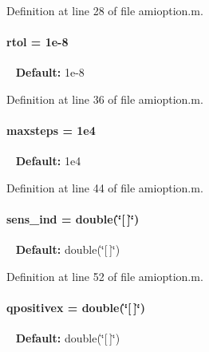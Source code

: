 Definition at line 28 of file amioption.\+m.

\hypertarget{classamioption_a7978e9a4674f869e6b2950e2f6262ca5}{}
\paragraph[{rtol}]{\setlength{\rightskip}{0pt plus 5cm}rtol = 1e-\/8}\label{classamioption_a7978e9a4674f869e6b2950e2f6262ca5}
~\newline
{\bfseries Default\+:} 1e-\/8 

Definition at line 36 of file amioption.\+m.

\hypertarget{classamioption_ac37622882dacee1f11688d4941ccb45e}{}
\paragraph[{maxsteps}]{\setlength{\rightskip}{0pt plus 5cm}maxsteps = 1e4}\label{classamioption_ac37622882dacee1f11688d4941ccb45e}
~\newline
{\bfseries Default\+:} 1e4 

Definition at line 44 of file amioption.\+m.

\hypertarget{classamioption_a0505783cf66f362672cbe3320d47a94d}{}
\paragraph[{sens\+\_\+ind}]{\setlength{\rightskip}{0pt plus 5cm}sens\+\_\+ind = double(\char`\"{}\mbox{[}$\,$\mbox{]}\char`\"{})}\label{classamioption_a0505783cf66f362672cbe3320d47a94d}
~\newline
{\bfseries Default\+:} double(\char`\"{}\mbox{[}$\,$\mbox{]}\char`\"{}) 

Definition at line 52 of file amioption.\+m.

\hypertarget{classamioption_a8938c19fd7067f4780be8255764210b7}{}
\paragraph[{qpositivex}]{\setlength{\rightskip}{0pt plus 5cm}qpositivex = double(\char`\"{}\mbox{[}$\,$\mbox{]}\char`\"{})}\label{classamioption_a8938c19fd7067f4780be8255764210b7}
~\newline
{\bfseries Default\+:} double(\char`\"{}\mbox{[}$\,$\mbox{]}\char`\"{}) 

